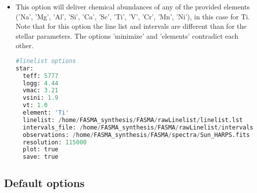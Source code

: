 \documentclass[a4paper,12pt]{article}
\begin{document}
\begin{itemize}
 \item This option will deliver chemical abundances of any of the provided elements ('Na', 'Mg', 'Al', 'Si', 'Ca', 'Sc', 'Ti', 'V', 'Cr', 'Mn', 'Ni'), in this case for Ti. 
 Note that for this option the line list and intervals are different than for the stellar parameters. The options 'minimize' and 'elements' contradict each other.
 {\footnotesize

\begin{lstlisting}[language=Python]
#linelist options
star:
  teff: 5777
  logg: 4.44
  vmac: 3.21
  vsini: 1.9
  vt: 1.0
  element: 'Ti'
  linelist: /home/FASMA_synthesis/FASMA/rawLinelist/linelist.lst
  intervals_file: /home/FASMA_synthesis/FASMA/rawLinelist/intervals.lst
  observations: /home/FASMA_synthesis/FASMA/spectra/Sun_HARPS.fits
  resolution: 115000
  plot: true
  save: true
\end{lstlisting}}

\end{itemize}


\subsection{Default options}
\end{document}
